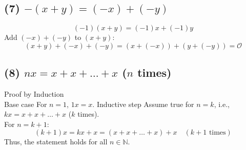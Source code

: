 \documentclass{article}
\begin{document}
\subsection*{(7) $-(x + y) = (-x) + (-y)$}
\[
(-1)(x + y) = (-1)x + (-1)y
\]
Add $(-x) + (-y)$ to $(x + y)$:
\[
(x + y) + (-x) + (-y) = (x + (-x)) + (y + (-y)) = \mathcal{O}
\]

\subsection*{(8) $nx = x + x + \dots + x$ ($n$ times)}
Proof by Induction \\
Base case For $n = 1$, $1x = x$. \newline
Inductive step Assume true for $n = k$, i.e., $kx = x + x + \dots + x$ ($k$ times). \\
For $n = k + 1$:
\[
(k + 1)x = kx + x = (x + x + \dots + x) + x \quad (k + 1 \text{ times})
\]
Thus, the statement holds for all $n \in \mathbb{N}$.
\end{document}
